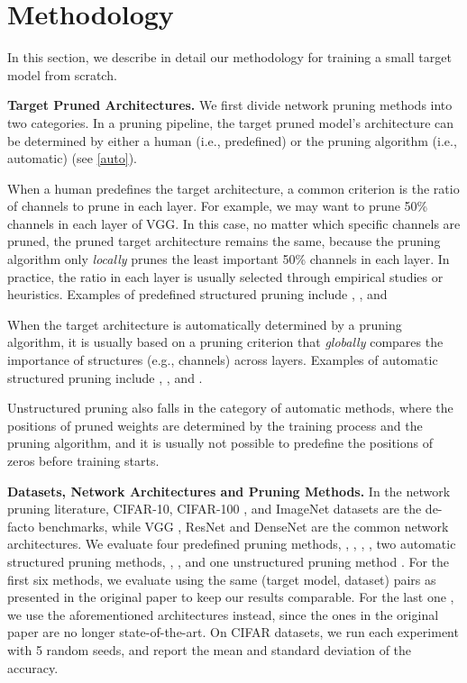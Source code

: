 
\vspace{-2ex}
\section{Methodology}
\vspace{-2ex}
In this section, we describe in detail our methodology for training a small target model from scratch.


\textbf{Target Pruned Architectures.} We first divide network pruning methods into two categories. In a pruning pipeline, the target pruned model's architecture can be determined by either a human (i.e., predefined) or the pruning algorithm (i.e., automatic) (see \autoref{auto}).

When a human predefines the target architecture, a common criterion is the ratio of channels to prune in each layer. For example, we may want to prune 50\% channels in each layer of VGG. In this case, no matter which specific channels are pruned, the pruned target architecture remains the same, because the pruning algorithm only \emph{locally} prunes the least important 50\% channels in each layer. In practice, the ratio in each layer is usually selected through empirical studies or heuristics. Examples of predefined structured pruning include \cite{li2016pruning}, \cite{luo2017thinet}, \cite{ he2017channel} and \cite{he2018sfp}

When the target architecture is automatically determined by a pruning algorithm, it is usually based on a pruning criterion that \emph{globally} compares the importance of structures (e.g., channels) across layers. Examples of automatic structured pruning include \cite{liu2017learning}, \cite{huang2018data}, \cite{nvidia} and \cite{pfa}. 

Unstructured pruning \citep{han2015learning, vdropout, l0sparse} also falls in the category of automatic methods, where the positions of pruned weights are determined by the training process and the pruning algorithm, and it is usually not possible to predefine the positions of zeros before training starts.

\textbf{Datasets, Network Architectures and Pruning Methods.}
In the network pruning literature, CIFAR-10, CIFAR-100 \citep{cifar}, and ImageNet \citep{imagenet} datasets are the de-facto benchmarks, while VGG \citep{vgg}, ResNet \citep{resnet} and DenseNet  \citep{densenet} are the common network architectures. 
We evaluate four predefined pruning methods, \cite{li2016pruning}, \cite{luo2017thinet}, \cite{he2017channel}, \cite{he2018sfp}, two automatic structured pruning methods, \cite{liu2017learning}, \cite{ huang2018data}, and one unstructured pruning method \citep{han2015learning}. For the first six methods, we evaluate using the same (target model, dataset) pairs as presented in the original paper to keep our results comparable. For the last one \citep{han2015learning}, we use the aforementioned architectures instead, since the ones in the original paper are no longer state-of-the-art. On CIFAR datasets, we run each experiment with 5 random seeds, and report the mean and standard deviation of the accuracy. 

